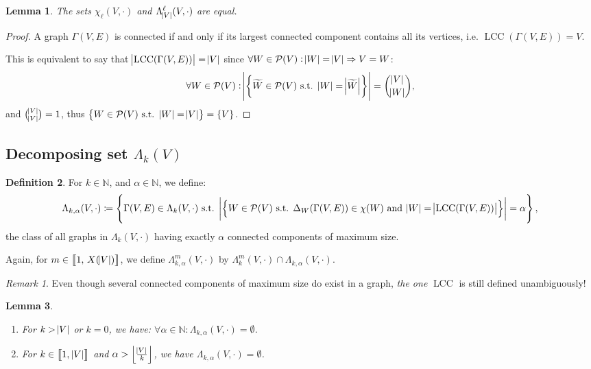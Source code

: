 \documentclass{article}
\newtheorem{lemma}{Lemma}[section]
\theoremstyle{definition}
\newtheorem{definition}[lemma]{Definition}
\theoremstyle{remark}
\newtheorem*{remark}{Remark}
\DeclareMathOperator{\LCC}{LCC}
\newcommand{\N}{\mathbb N}
\newcommand{\intint}[2]{\left\llbracket#1, \, #2\right\rrbracket}
\newcommand{\floor}[1]{\left\lfloor#1\right\rfloor}
\newcommand{\st}{\text{ s.t. }}
\begin{document}
	\begin{lemma} The sets $\chi_\ell(V, \cdot)$ and $\Lambda_{\abs V}^\ell(V, \cdot)$ are equal.
	\end{lemma}

	\begin{proof} A graph $\Gamma(V, E)$ is connected if and only if its largest connected component contains all its vertices, i.e. $\LCC(\Gamma(V, E)) = V$.

	This is equivalent to say that $\abs {\LCC(\Gamma(V, E))} = \abs V$ since $\forall W \in \mathcal P(V) : \abs W = \abs V \Rightarrow V = W$:
	\[\forall W \in \mathcal P(V) : \abs {\left\{\widetilde W \in \mathcal P(V) \st \abs W = \abs {\widetilde W}\right\}} = \binom {\abs V}{\abs W},\]
	and $\binom {\abs V}{\abs V} = 1$, thus $\left\{W \in \mathcal P(V) \st \abs W = \abs V\right\} = \{V\}$.
	\end{proof}

	\subsection{Decomposing set $\Lambda_k(V)$}
		\begin{definition} For $k \in \N$, and $\alpha \in \N$, we define:
		\[\Lambda_{k,\alpha}(V, \cdot) \coloneqq \left\{\Gamma(V, E) \in \Lambda_k(V, \cdot) \st
			\abs {\left\{W \in \mathcal P(V) \st \Delta_W(\Gamma(V, E)) \in \chi(W) \text{ and } \abs W = \abs {\LCC(\Gamma(V, E))}\right\}} = \alpha\right\},\]
		the class of all graphs in $\Lambda_k(V, \cdot)$ having exactly $\alpha$ connected components of maximum size.

		Again, for $m \in \intint 1{X(\abs V)}$, we define $\Lambda_{k,\alpha}^m(V, \cdot)$ by $\Lambda_k^m(V, \cdot) \cap \Lambda_{k,\alpha}(V, \cdot)$.
		\end{definition}

		\begin{remark} Even though several connected components of maximum size do exist in a graph, \textit{the one} $\LCC$ is still defined unambiguously!
		\end{remark}

		\begin{lemma}~
		\begin{enumerate}
			\item For $k > \abs V$ or $k=0$, we have: $\forall \alpha \in \N : \Lambda_{k,\alpha}(V, \cdot) = \emptyset$.
			\item For $k \in \intint 1{\abs V}$ and $\alpha > \floor {\frac {\abs V}k}$, we have $\Lambda_{k,\alpha}(V, \cdot) = \emptyset$.
		\end{enumerate}
		\end{lemma}
\end{document}
